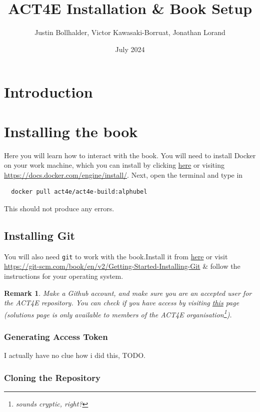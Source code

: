 \documentclass{article}
\title{ACT4E Installation \& Book Setup}
\author{ Justin Bollhalder, Victor Kawasaki-Borruat, Jonathan Lorand}
\date{July 2024}
\newtheorem{remark}{Remark}
\begin{document}
\maketitle

\section{Introduction}


\section{Installing the book}
Here you will learn how to interact with the book. You will need to install Docker on your work machine, which you can install by clicking  \href{https://docs.docker.com/engine/install/}{here} or visiting \url{https://docs.docker.com/engine/install/}. Next, open the terminal and type in
\begin{verbatim}
  docker pull act4e/act4e-build:alphubel
\end{verbatim}
This should not produce any errors.


\subsection{Installing Git}
You will also need \texttt{git} to work with the book.Install it from \href{https://git-scm.com/book/en/v2/Getting-Started-Installing-Git}{here} or visit \url{https://git-scm.com/book/en/v2/Getting-Started-Installing-Git} \& follow the instructions for your operating system.

\begin{remark}
    Make a Github account, and make sure you are an accepted user for the ACT4E repository. You can check if you have access by visiting \href{https://github.com/ACT4E/ACT4E-solutions}{this} page (solutions page is only available to members of the ACT4E organisation\footnote{sounds cryptic, right?}).
\end{remark}

\subsubsection{Generating Access Token}
I actually have no clue how i did this, TODO.

\subsubsection{Cloning the Repository}
\end{document}
